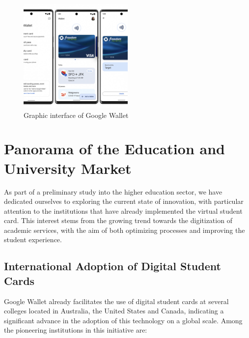 \documentclass{article}
\begin{document}
\begin{figure}[H]
    \centering
    \includegraphics[width=0.5\textwidth]{images/Google_Wallet.png}
    \caption{Graphic interface of Google Wallet}
    \label{fig:my_label}
\end{figure}

\section{Panorama of the Education and University Market}
As part of a preliminary study into the higher education sector, we have dedicated ourselves to exploring the current state of innovation, with particular attention to the institutions
that have already implemented the virtual student card. This interest stems from the
growing trend towards the digitization of academic services, with the aim of both
optimizing processes and improving the student experience.

\subsection{International Adoption of Digital Student Cards}
Google Wallet already facilitates the use of digital student cards at
several colleges located in Australia, the United States and Canada, indicating
a significant advance in the adoption of this technology on a global scale. Among the
pioneering institutions in this initiative are:
\end{document}
